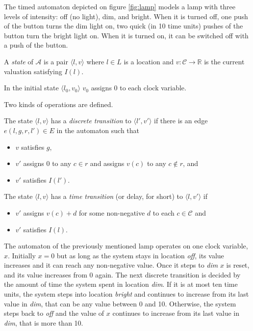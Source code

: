 \begin{example}
	The timed automaton depicted on figure \ref{fig:lamp} models a lamp with three levels of intensity: off (no light), dim, and bright. When it is turned off, one push of the button turns the dim light on, two quick (in 10 time units) pushes of the button turn the bright light on. When it is turned on, it can be switched off with a push of the button.
\end{example}

\begin{dfn}
	A \emph{state} of $\mathcal{A}$ is a pair $\langle l,v \rangle$ where $l \in L$ is a
	location and $v:\mathcal{C} \to \mathds{R}$ is the current valuation satisfying $I(l)$.
\end{dfn}
 In the initial state $\langle l_0,v_0 \rangle$ $v_0$ assigns 0 to each clock variable.

Two kinds of operations are defined.

\begin{dfn}
	 The state $\langle l,v \rangle$ has a
	 \emph{discrete transition} to $\langle l',v' \rangle$  if there is an
	 edge $e(l,g,r,l') \in E$ in the automaton such that 
	 \begin{itemize}
	 	\item $v$ satisfies $g$, 
	 	\item $v'$ assigns 0 to any $c \in r$ and assigns $v(c)$ to any $c \not\in r$, and
	 	\item $v'$ satisfies $I(l')$. 
	 \end{itemize}
\end{dfn}

\begin{dfn}
The state $\langle l,v \rangle$ has a \emph{time transition} (or delay, for short) to $\langle l,v' \rangle$ if
\begin{itemize}
	\item $v'$ assigns $v(c)+d$ for some non-negative $d$ to each $c \in \mathcal{C}$ and
	\item $v'$ satisfies $I(l)$. 
\end{itemize}
\end{dfn}

\begin{example}
	The automaton of the previously mentioned lamp operates on one clock variable, $x$. Initially $x=0$ but as long as the system stays in location \emph{off}, its value increases and it can reach any non-negative value. Once it steps to \emph{dim} $x$ is reset, and its value increases from 0 again. The next discrete transition is decided by the amount of time the system spent in location \emph{dim}. If it is at most ten time units, the system steps into location \emph{bright} and continues to increase from its last value in \emph{dim}, that can be any value between 0 and 10. Otherwise, the system steps back to \emph{off} and the value of $x$ continues to increase from its last value in \emph{dim}, that is more than 10.
\end{example}

